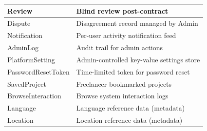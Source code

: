 \begin{table}[h]
\begin{tabular}{|p{4cm}|p{9.5cm}|}
Review & Blind review post-contract \\ \hline
Dispute & Disagreement record managed by Admin \\ \hline
Notification & Per-user activity notification feed \\ \hline
AdminLog & Audit trail for admin actions \\ \hline
PlatformSetting & Admin-controlled key-value settings store \\ \hline
PasswordResetToken & Time-limited token for password reset \\ \hline
SavedProject & Freelancer bookmarked projects \\ \hline
BrowseInteraction & Browse system interaction logs \\ \hline
Language & Language reference data (metadata) \\ \hline
Location & Location reference data (metadata) \\ \hline
\end{tabular}
\end{table}

